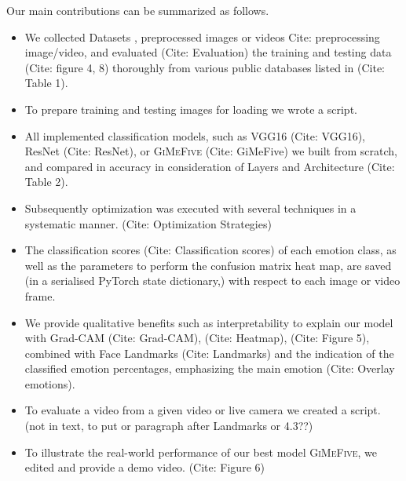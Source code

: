 Our main contributions can be summarized as follows.
\begin{itemize}
  \item We collected Datasets , preprocessed images or videos Cite: preprocessing image/video, and evaluated (Cite: Evaluation) the training and testing data (Cite: figure 4, 8) thoroughly from various 
  public databases listed in (Cite: Table 1).

  \item To prepare training and testing images for loading we wrote a script.

  \item All implemented classification models, such as VGG16 (Cite: VGG16), ResNet (Cite: ResNet), or \textsc{GiMeFive} (Cite: GiMeFive) we built from scratch, and compared in accuracy in consideration of Layers and Architecture (Cite: Table 2).

  \item Subsequently optimization was executed with several techniques in a systematic manner. (Cite: Optimization Strategies)

  \item The classification scores (Cite: Classification scores) of each emotion class, as well as the parameters to perform the confusion matrix heat map, are saved (in a serialised PyTorch state dictionary,) with respect to each image or video frame.

  \item We provide qualitative benefits such as interpretability to explain our model with Grad-CAM (Cite: Grad-CAM), (Cite: Heatmap), (Cite: Figure 5), combined with Face Landmarks (Cite: Landmarks) and the indication of the classified emotion 
  percentages, emphasizing the main emotion (Cite: Overlay emotions).

  \item To evaluate a video from a given video or live camera we created a script. (not in text, to put or paragraph after Landmarks or 4.3??)

	\item To illustrate the real-world performance of our best model \textsc{GiMeFive}, we edited and provide a demo video. (Cite: Figure 6)

\end{itemize}

